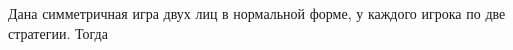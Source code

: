 \task
Дана симметричная игра двух лиц в нормальной форме, у каждого игрока по две стратегии. Тогда

\begin{enumerate}[label=$\square$]
	
	
	
	

\end{enumerate}
